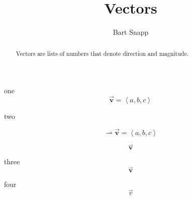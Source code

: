 \documentclass{ximera}
\author{Bart Snapp}
\title[Dig-In:]{Vectors}
\begin{document}
\begin{abstract}
  Vectors are lists of numbers that denote direction and magnitude.
\end{abstract}
\maketitle




one
\[ \mathbf{\vec{v}} = \left\langle a,b,c \right\rangle   \]





two

\[ \rightharpoonup{\mathbf{\vec{v}}} = \left\langle a,b,c \right\rangle   \]



\[ {{\overset{\boldsymbol{\rightharpoonup}}{\mathbf{v}}}}  \]

three
\[ {\overset{\boldsymbol{\rightharpoonup}}{\mathbf{v}}}  \]

four
\[ {{\overset{\boldsymbol{\rightharpoonup}}{v}}} \]
\end{document}
